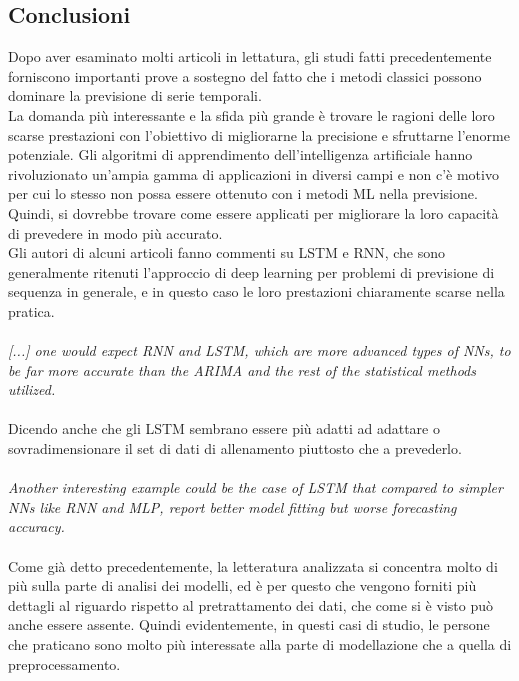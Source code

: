 \documentclass[12pt,a4paper]{report}
\begin{document}
\subsection{Conclusioni}
Dopo aver esaminato molti articoli in lettatura, gli studi fatti precedentemente forniscono importanti prove a sostegno del fatto che i metodi classici possono dominare la previsione di serie temporali.\\
La domanda più interessante e la sfida più grande è trovare le ragioni delle loro scarse prestazioni con l'obiettivo di migliorarne la precisione e sfruttarne l'enorme potenziale. Gli algoritmi di apprendimento dell'intelligenza artificiale hanno rivoluzionato un'ampia gamma di applicazioni in diversi campi e non c'è motivo per cui lo stesso non possa essere ottenuto con i metodi ML nella previsione. Quindi, si dovrebbe trovare come essere applicati per migliorare la loro capacità di prevedere in modo più accurato.\\
Gli autori di alcuni articoli fanno commenti su LSTM e RNN, che sono generalmente ritenuti l'approccio di deep learning per problemi di previsione di sequenza in generale, e in questo caso le loro prestazioni chiaramente scarse nella pratica.\\
\\
\emph{[...] one would expect RNN and LSTM, which are more advanced types of NNs, to be far more accurate than the ARIMA and the rest of the statistical methods utilized.} \cite{makridakis2018statistical}\\
\\
Dicendo anche che gli LSTM sembrano essere più adatti ad adattare o sovradimensionare il set di dati di allenamento piuttosto che a prevederlo.\\
\\
\emph{Another interesting example could be the case of LSTM that compared to simpler NNs like RNN and MLP, report better model fitting but worse forecasting accuracy.} \cite{makridakis2018statistical}\\
\\
Come già detto precedentemente, la letteratura analizzata si concentra molto di più sulla parte di analisi dei modelli, ed è per questo che vengono forniti più dettagli al riguardo rispetto al pretrattamento dei dati, che come si è visto può anche essere assente.
Quindi evidentemente, in questi casi di studio, le persone che praticano sono molto più interessate alla parte di modellazione che a quella di preprocessamento.
\end{document}
